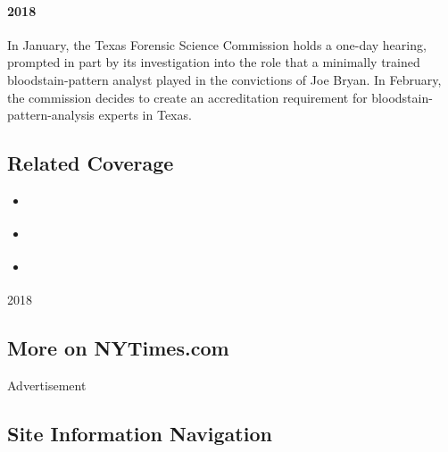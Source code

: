 \hypertarget{2018}{%
\paragraph{2018}\label{2018}}

In January, the Texas Forensic Science Commission holds a one-day
hearing, prompted in part by its investigation into the role that a
minimally trained bloodstain-pattern analyst played in the convictions
of Joe Bryan. In February, the commission decides to create an
accreditation requirement for bloodstain-pattern-analysis experts in
Texas.

\hypertarget{related-coverage}{%
\subsection{Related Coverage}\label{related-coverage}}

\begin{itemize}
\tightlist
\item
  \href{https://www.nytimes3xbfgragh.onion/interactive/2018/05/23/magazine/joe-bryan-blood-forensics-murder.html}{}
\item
  \href{https://www.nytimes3xbfgragh.onion/interactive/2018/05/31/magazine/joe-bryan-part-2-blood-spatter-analysis-faulty-evidence.html}{}
\item
  \href{https://www.nytimes3xbfgragh.onion/interactive/2018/05/31/magazine/bloodstain-pattern-analysis-timeline.html}{}
\end{itemize}

2018

\hypertarget{more-on-nytimescom}{%
\subsection{More on NYTimes.com}\label{more-on-nytimescom}}

Advertisement

\hypertarget{site-information-navigation}{%
\subsection{Site Information
Navigation}\label{site-information-navigation}}


